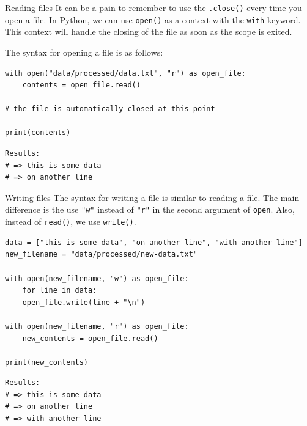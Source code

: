 \documentclass[10pt]{beamer}
\begin{document}
\begin{frame}[label={sec:orgb80eaea},fragile]{Reading files}
 It can be a pain to remember to use the \texttt{.close()} every time you open a file. In
Python, we can use \texttt{open()} as a context with the \texttt{with} keyword. This context will
handle the closing of the file as soon as the scope is exited.

The syntax for opening a file is as follows:

\begin{verbatim}
with open("data/processed/data.txt", "r") as open_file:
    contents = open_file.read()

# the file is automatically closed at this point

print(contents)
\end{verbatim}

\begin{verbatim}
Results: 
# => this is some data
# => on another line
\end{verbatim}
\end{frame}

\begin{frame}[label={sec:org5de613b},fragile]{Writing files}
 The syntax for writing a file is similar to reading a file. The main difference is
the use \texttt{"w"} instead of \texttt{"r"} in the second argument of \texttt{open}. Also, instead of \texttt{read()},
we use \texttt{write()}.

\begin{verbatim}
data = ["this is some data", "on another line", "with another line"]
new_filename = "data/processed/new-data.txt"

with open(new_filename, "w") as open_file:
    for line in data:
	open_file.write(line + "\n")

with open(new_filename, "r") as open_file:
    new_contents = open_file.read()

print(new_contents)
\end{verbatim}

\begin{verbatim}
Results: 
# => this is some data
# => on another line
# => with another line
\end{verbatim}
\end{frame}
\end{document}
